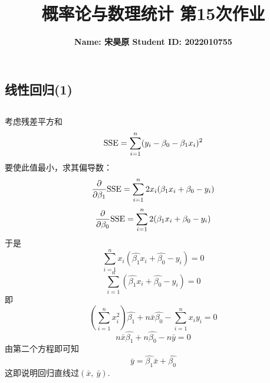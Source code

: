 \documentclass{article}
\title{\bf\Large  概率论与数理统计 第15次作业}
\author{\bf Name: 宋昊原 \qquad Student ID: 2022010755}
\begin{document}
\begin{CJK}{UTF8}{gbsn}
\maketitle
\section{线性回归(1)}
\subsection{}
考虑残差平方和
$$ {\rm SSE}=\sum\limits_{i=1}^{n}(y_{i}-\beta_{0}-\beta_{1}x_{i})^{2}$$
要使此值最小，求其偏导数：
$$ \frac{\partial}{\partial\beta_{1}}{\rm SSE}=\sum\limits_{i=1}^{n}2x_{i}(\beta_{1}x_{i}+\beta_{0}-y_{i})$$
$$ \frac{\partial}{\partial\beta_{0}}{\rm SSE}=\sum\limits_{i=1}^{n}2(\beta_{1}x_{i}+\beta_{0}-y_{i})$$
于是
$$ \sum\limits_{i=1}^{n}x_{i}(\hat{\beta_{1}}x_{i}+\hat{\beta_{0}}-y_{i})=0 $$
$$ \sum\limits_{i=1}^{n}(\hat{\beta_{1}}x_{i}+\hat{\beta_{0}}-y_{i})=0 $$
即
$$ (\sum\limits_{i=1}^{n}x_{i}^{2})\hat{\beta_{1}}+n\bar{x}\hat{\beta_{0}}-\sum\limits_{i=1}^{n}x_{i}y_{i}=0$$
$$ n\bar{x}\hat{\beta_{1}}+n\hat{\beta_{0}}-n\bar{y}=0$$
由第二个方程即可知
$$ \bar{y}=\hat{\beta_{1}}\bar{x}+\hat{\beta_{0}} $$
这即说明回归直线过$(\bar{x},\ \bar{y})$.

\end{CJK}
\end{document}
